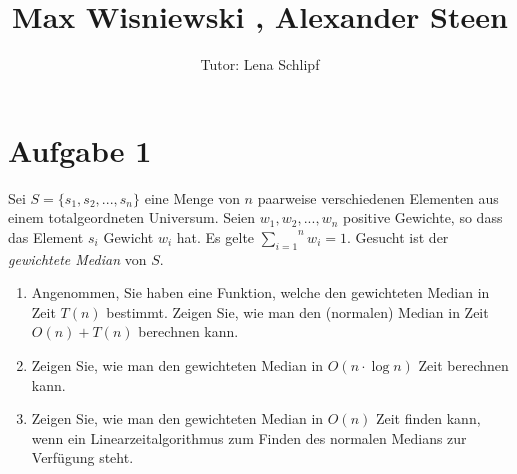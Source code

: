 \documentclass[11pt,a4paper,ngerman]{article}
\author{Tutor: Lena Schlipf}
\date{}
\title{Max Wisniewski , Alexander Steen}
\begin{document}

\maketitle
\thispagestyle{fancy}


\section*{Aufgabe 1}

Sei $S = \{ s_1, s_2, ..., s_n \} $ eine Menge von $n$ paarweise verschiedenen Elementen aus einem totalgeordneten Universum. Seien $w_1, w_2, ..., w_n$ positive Gewichte, so dass das Element $s_i$ Gewicht $w_i$ hat. Es gelte $\overset{n}{\underset{i=1}{\sum}} w_i = 1$. Gesucht ist der \emph{gewichtete Median} von $S$.

\begin{enumerate}[\bfseries (a)]

\item Angenommen, Sie haben eine Funktion, welche den gewichteten Median in Zeit $T(n)$ bestimmt. Zeigen Sie, wie man den (normalen) Median in Zeit $O(n) + T(n)$ berechnen kann.

\item  Zeigen Sie, wie man den gewichteten Median in $O(n \cdot \log n)$ Zeit berechnen kann.

\item Zeigen Sie, wie man den gewichteten Median in $O(n)$ Zeit  finden kann, wenn ein Linearzeitalgorithmus zum Finden des normalen Medians zur Verfügung steht.

\end{enumerate}
\end{document}
